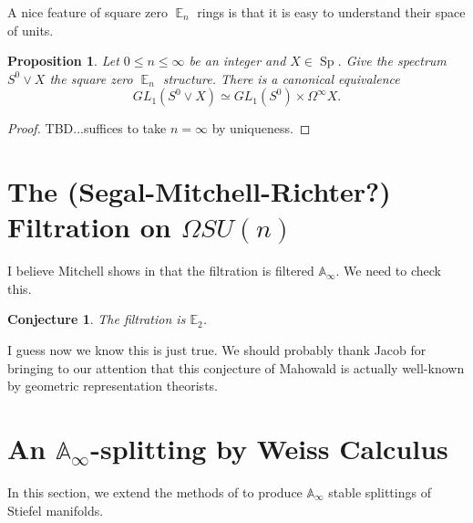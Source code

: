 \documentclass[reqno, oneside]{amsart}
\theoremstyle{definition}
\theoremstyle{plain}
\newtheorem{prop}[nul]{Proposition}
\newtheorem{cnj}[nul]{Conjecture}
\DeclareMathOperator{\E}{\mathbb{E}}
\DeclareMathOperator{\Sp}{\text{Sp}}
\begin{document}
A nice feature of square zero $\E_n$ rings is that it is easy to understand their space of units.  

\begin{prop}
Let $0\leq n\leq \infty$ be an integer and $X\in \Sp$.  Give the spectrum $S^0\vee X$ the square zero $\E_n$ structure.  There is a canonical equivalence $$GL_1(S^0\vee X) \simeq GL_1(S^0) \times \Omega^{\infty} X.$$
\end{prop}
\begin{proof}
TBD...suffices to take $n=\infty$ by uniqueness.  
\end{proof}


\section{The (Segal-Mitchell-Richter?) Filtration on \texorpdfstring{$\Omega SU(n)$}{Loops SU(n)}}

I believe Mitchell shows in \cite{MitchellSU(n)} that the filtration is filtered $\mathbb{A}_\infty$.  We need to check this.

\begin{cnj} The filtration is $\mathbb{E}_2$.
\end{cnj}
I guess now we know this is just true.  We should probably thank Jacob for bringing to our attention that this conjecture of Mahowald is actually well-known by geometric representation theorists.  

\section{An \texorpdfstring{$\mathbb{A}_\infty$}{Aoo}-splitting by Weiss Calculus} \label{sec:AooSplit}


In this section, we extend the methods of \cite{Arone} to produce $\mathbb{A}_\infty$ stable splittings of Stiefel manifolds.  
\end{document}
